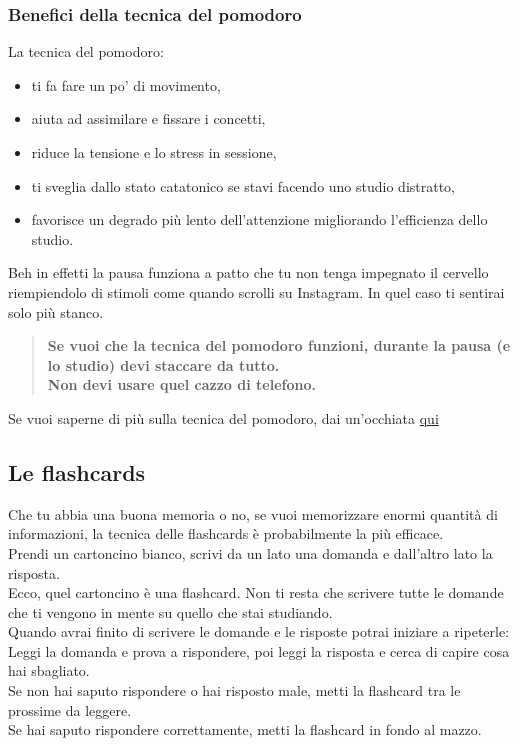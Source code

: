 \documentclass[18pt]{extarticle}
\begin{document}
\subsubsection{Benefici della tecnica del pomodoro}
La tecnica del pomodoro:
\begin{itemize}
\item ti fa fare un po' di movimento,
\item aiuta ad assimilare e fissare i concetti,
\item riduce la tensione e lo stress in sessione,
\item ti sveglia dallo stato catatonico se stavi facendo uno studio distratto,
\item favorisce un degrado più lento dell'attenzione migliorando l'efficienza dello studio.
\end{itemize}
Beh in effetti la pausa funziona a patto che tu non tenga impegnato il cervello riempiendolo di stimoli come quando scrolli su Instagram. In quel caso ti sentirai solo più stanco.
\begin{quote}
\textbf{Se vuoi che la tecnica del pomodoro funzioni, durante la pausa (e lo studio) devi staccare da tutto.\\
Non devi usare quel cazzo di telefono.}
\end{quote}
Se vuoi saperne di più sulla tecnica del pomodoro, dai un'occhiata \href{https://it.wikipedia.org/wiki/Tecnica_del_pomodoro}{qui}


\subsection{Le flashcards}
Che tu abbia una buona memoria o no, se vuoi memorizzare enormi quantità di informazioni, la tecnica delle flashcards è probabilmente la più efficace.\\
Prendi un cartoncino bianco, scrivi da un lato una domanda e dall'altro lato la risposta.\\
Ecco, quel cartoncino è una flashcard. Non ti resta che scrivere tutte le domande che ti vengono in mente su quello che stai studiando.\\
Quando avrai finito di scrivere le domande e le risposte potrai iniziare a ripeterle:\\
Leggi la domanda e prova a rispondere, poi leggi la risposta e cerca di capire cosa hai sbagliato.\\
Se non hai saputo rispondere o hai risposto male, metti la flashcard tra le prossime da leggere.\\
Se hai saputo rispondere correttamente, metti la flashcard in fondo al mazzo.\\
\end{document}

